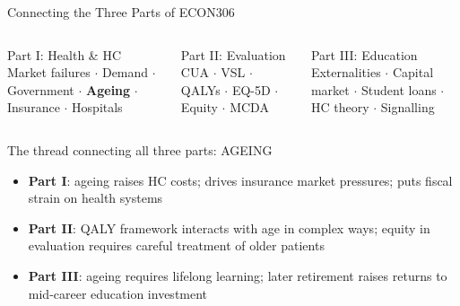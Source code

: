 \documentclass[aspectratio=169, 12pt]{beamer}
\begin{document}
\begin{frame}{Connecting the Three Parts of ECON306}
  \begin{columns}
      \begin{block}{Part I: Health \& HC}
        {\small Market failures $\cdot$ Demand $\cdot$ Government $\cdot$ \textbf{Ageing} $\cdot$ Insurance $\cdot$ Hospitals}
      \end{block}
      \begin{alertblock}{Part II: Evaluation}
        {\small CUA $\cdot$ VSL $\cdot$ QALYs $\cdot$ EQ-5D $\cdot$ Equity $\cdot$ MCDA}
      \end{alertblock}
      \begin{block}{Part III: Education}
        {\small Externalities $\cdot$ Capital market $\cdot$ Student loans $\cdot$ HC theory $\cdot$ Signalling}
      \end{block}
  \end{columns}
  \vspace{0.6em}
  \begin{exampleblock}{The thread connecting all three parts: AGEING}
    \begin{itemize}
      \item \textbf{Part I}: ageing raises HC costs; drives insurance market pressures;
            puts fiscal strain on health systems
      \item \textbf{Part II}: QALY framework interacts with age in complex ways;
            equity in evaluation requires careful treatment of older patients
      \item \textbf{Part III}: ageing requires lifelong learning; later retirement
            raises returns to mid-career education investment
    \end{itemize}
  \end{exampleblock}
\end{frame}
\end{document}
